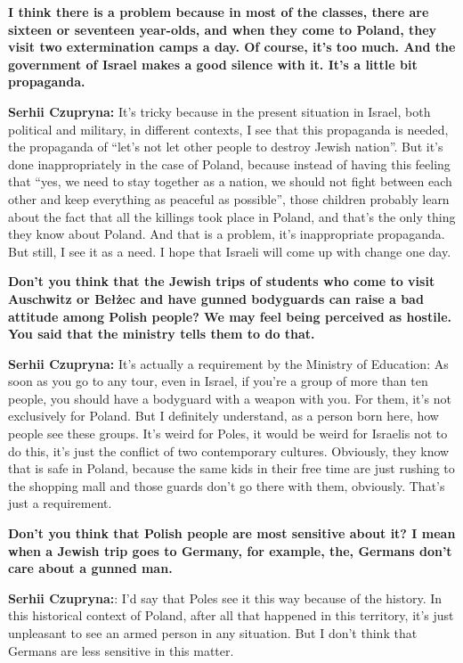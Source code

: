 \textbf{I think there is a problem because in most of the classes, there are sixteen or seventeen year-olds, and when they come to Poland, they visit two extermination camps a day. Of course, it’s too much. And the government of Israel makes a good silence with it. It’s a little bit propaganda.}\par  
\textbf{Serhii Czupryna:} It’s tricky because in the present situation in Israel, both political and military, in different contexts, I see that this propaganda is needed, the propaganda of ``let’s not let other people to destroy Jewish nation''. But it’s done inappropriately in the case of Poland, because instead of having this feeling that ``yes, we need to stay together as a nation, we should not fight between each other and keep everything as peaceful as possible'', those children probably learn about the fact that all the killings took place in Poland, and that’s the only thing they know about Poland. And that is a problem, it’s inappropriate propaganda. But still, I see it as a need. I hope that Israeli will come up with change one day. \par 
\textbf{Don’t you think that the Jewish trips of students who come to visit Auschwitz or Bełżec and have gunned bodyguards can raise a bad attitude among Polish people? We may feel being perceived as hostile. You said that the ministry tells them to do that.}\par
\textbf{Serhii Czupryna:} It’s actually a requirement by the Ministry of Education: As soon as you go to any tour, even in Israel, if you’re a group of more than ten people, you should have a bodyguard with a weapon with you. For them, it’s not exclusively for Poland. But I definitely understand, as a person born here, how people see these groups. It’s weird for Poles, it would be weird for Israelis not to do this, it’s just the conflict of two contemporary cultures. Obviously, they know that is safe in Poland, because the same kids in their free time are just rushing to the shopping mall and those guards don’t go there with them, obviously. That’s just a requirement. \par
\textbf{Don’t you think that Polish people are most sensitive about it? I mean when a Jewish trip goes to Germany, for example, the, Germans don’t care about a gunned man.} \par
\textbf{Serhii Czupryna:}: I’d say that Poles see it this way because of the history. In this historical context of Poland, after all that happened in this territory, it’s just unpleasant to see an armed person in any situation. But I don’t think that Germans are less sensitive in this matter.\par

